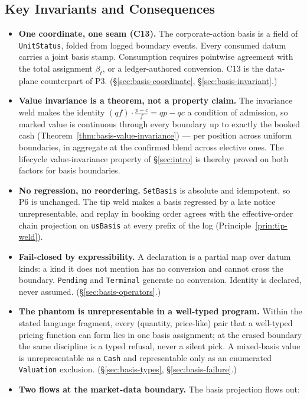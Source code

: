 \subsection*{Key Invariants and Consequences}

\begin{itemize}[nosep]
\item \textbf{One coordinate, one seam (C13).} The corporate-action basis is a field
of \texttt{UnitStatus}, folded from logged boundary events. Every consumed datum
carries a joint basis stamp. Consumption requires pointwise agreement with the total
assignment $\beta_t$, or a ledger-authored conversion. C13 is the data-plane
counterpart of P3.
(\S\ref{sec:basis-coordinate}, \S\ref{sec:basis-invariant}.)
\item \textbf{Value invariance is a theorem, not a property claim.} The invariance
weld makes the identity $(qf)\cdot\frac{p-c}{f}=qp-qc$ a condition of admission, so
marked value is continuous through every boundary up to exactly the booked cash
(Theorem~\ref{thm:basis-value-invariance}) --- per position across uniform
boundaries, in aggregate at the confirmed blend across elective ones. The lifecycle
value-invariance property of
\S\ref{sec:intro} is thereby proved on both factors for basis boundaries.
\item \textbf{No regression, no reordering.} \texttt{SetBasis} is absolute and
idempotent, so P6 is unchanged. The tip weld makes a basis regressed by a late notice
unrepresentable, and replay in booking order agrees with the effective-order chain
projection on \texttt{usBasis} at every prefix of the log
(Principle~\ref{prin:tip-weld}).
\item \textbf{Fail-closed by expressibility.} A declaration is a partial map over
datum kinds: a kind it does not mention has no conversion and cannot cross the
boundary. \texttt{Pending} and \texttt{Terminal} generate no conversion. Identity is
declared, never assumed. (\S\ref{sec:basis-operators}.)
\item \textbf{The phantom is unrepresentable in a well-typed program.} Within the
stated language fragment, every (quantity, price-like) pair that a well-typed pricing
function can form lies in one basis assignment; at the erased boundary the same
discipline is a typed refusal, never a silent pick. A mixed-basis value is
unrepresentable as a \texttt{Cash} and representable only as an enumerated
\texttt{Valuation} exclusion.
(\S\ref{sec:basis-types}, \S\ref{sec:basis-failure}.)
\item \textbf{Two flows at the market-data boundary.} The basis projection flows out:

\end{itemize}
